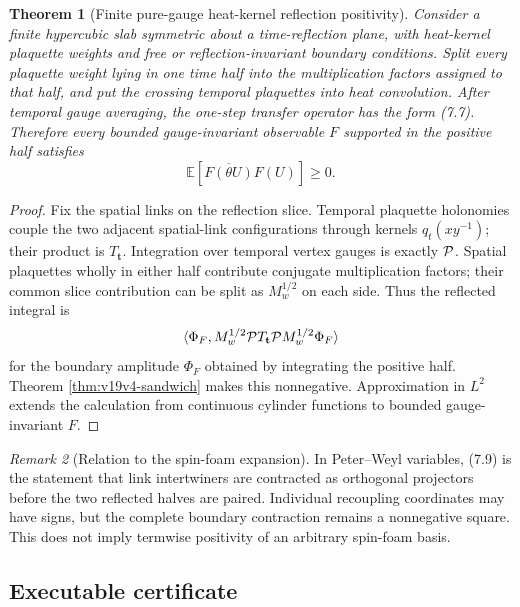 \documentclass[11pt]{article}
\newtheorem{theorem}{Theorem}[section]
\theoremstyle{remark}
\newtheorem{remark}[theorem]{Remark}
\begin{document}
\begin{theorem}[Finite pure-gauge heat-kernel reflection positivity]
\label{thm:v19v4-finite-rp}
Consider a finite hypercubic slab symmetric about a time-reflection plane,
with heat-kernel plaquette weights and free or reflection-invariant boundary
conditions.  Split every plaquette weight lying in one time half into the
multiplication factors assigned to that half, and put the crossing temporal
plaquettes into heat convolution.  After temporal gauge averaging, the
one-step transfer operator has the form (7.7).  Therefore every bounded
gauge-invariant observable \(F\) supported in the positive half satisfies
\[
 \mathbb E\!\left[\overline{F(\theta U)}F(U)\right]\ge0.    \tag{7.10}
\]
\end{theorem}

\begin{proof}
Fix the spatial links on the reflection slice.  Temporal plaquette
holonomies couple the two adjacent spatial-link configurations through
kernels \(q_t(xy^{-1})\); their product is \(T_{\mathbf t}\).
Integration over temporal vertex gauges is exactly \({\cal P}\).
Spatial plaquettes wholly in either half contribute conjugate
multiplication factors; their common slice contribution can be split as
\(M_w^{1/2}\) on each side.  Thus the reflected integral is
\[
 \langle\Phi_F,
 M_w^{1/2}{\cal P}T_{\mathbf t}{\cal P}M_w^{1/2}\Phi_F\rangle
\]
for the boundary amplitude \(\Phi_F\) obtained by integrating the positive
half.  Theorem \ref{thm:v19v4-sandwich} makes this nonnegative.
Approximation in \(L^2\) extends the calculation from continuous cylinder
functions to bounded gauge-invariant \(F\).
\end{proof}

\begin{remark}[Relation to the spin-foam expansion]
\label{rem:v19v4-spin}
In Peter--Weyl variables, (7.9) is the statement that link intertwiners are
contracted as orthogonal projectors before the two reflected halves are
paired.  Individual recoupling coordinates may have signs, but the complete
boundary contraction remains a nonnegative square.  This does not imply
termwise positivity of an arbitrary spin-foam basis.
\end{remark}

\subsection{Executable certificate}
\end{document}
